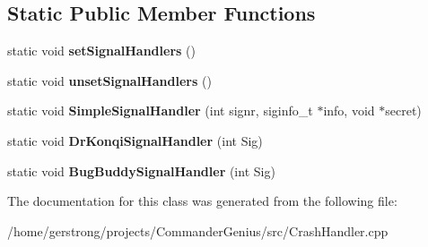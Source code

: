\subsection*{Static Public Member Functions}
\begin{DoxyCompactItemize}
\item 
\hypertarget{class_crash_handler_impl_af0f3a13210f092d947070a86868dbe97}{
static void {\bfseries setSignalHandlers} ()}
\label{class_crash_handler_impl_af0f3a13210f092d947070a86868dbe97}

\item 
\hypertarget{class_crash_handler_impl_a8c14b0a0a66bb3171f03ef2605eb1d8a}{
static void {\bfseries unsetSignalHandlers} ()}
\label{class_crash_handler_impl_a8c14b0a0a66bb3171f03ef2605eb1d8a}

\item 
\hypertarget{class_crash_handler_impl_a4eb13f3fce61ace9f11a1c5119e9dfb7}{
static void {\bfseries SimpleSignalHandler} (int signr, siginfo\_\-t $\ast$info, void $\ast$secret)}
\label{class_crash_handler_impl_a4eb13f3fce61ace9f11a1c5119e9dfb7}

\item 
\hypertarget{class_crash_handler_impl_a97aa1dd6e68dfd9a792c787f1f33334d}{
static void {\bfseries DrKonqiSignalHandler} (int Sig)}
\label{class_crash_handler_impl_a97aa1dd6e68dfd9a792c787f1f33334d}

\item 
\hypertarget{class_crash_handler_impl_a959b84599576631100a8cc674c72e160}{
static void {\bfseries BugBuddySignalHandler} (int Sig)}
\label{class_crash_handler_impl_a959b84599576631100a8cc674c72e160}

\end{DoxyCompactItemize}


The documentation for this class was generated from the following file:\begin{DoxyCompactItemize}
\item 
/home/gerstrong/projects/CommanderGenius/src/CrashHandler.cpp\end{DoxyCompactItemize}
